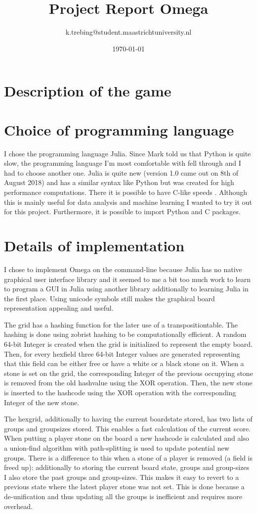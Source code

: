 \documentclass[a4paper]{article}
\title{Project Report Omega}
\author{k.trebing@student.maastrichtuniversity.nl}
\date{\today}
\begin{document}
\maketitle

\section{Description of the game}

\section{Choice of programming language}
I chose the programming language Julia. Since Mark told us that Python is quite slow, the programming language I'm most comfortable with fell through and I had to choose another one. Julia is quite new (version 1.0 came out on 8th of August 2018) \cite{julia1} and has a similar syntax like Python but was created for high performance computations. There it is possible to have C-like speeds \cite{benchmarks}. Although this is mainly useful for data analysis and machine learning I wanted to try it out for this project. Furthermore, it is possible to import Python and C packages.

\section{Details of implementation}
I chose to implement Omega on the command-line because Julia has no native graphical user interface library and it seemed to me a bit too much work to learn to program a GUI in Julia using another library additionally to learning Julia in the first place. Using unicode symbols still makes the graphical board representation appealing and useful.

The grid has a hashing function for the later use of a transpositiontable. The hashing is done using zobrist hashing \cite{zobrist1970new} to be computationally efficient. A random 64-bit Integer is created when the grid is initialized to represent the empty board. Then, for every hexfield three 64-bit Integer values are generated representing that this field can be either free or have a white or a black stone on it. When a stone is set on the grid, the corresponding Integer of the previous occupying stone is removed from the old hashvalue using the XOR operation. Then, the new stone is inserted to the hashcode using the XOR operation with the corresponding Integer of the new stone.

The hexgrid, additionally to having the current boardstate stored, has two lists of groups and groupsizes stored. This enables a fast calculation of the current score. When putting a player stone on the board a new hashcode is calculated and also a union-find algorithm \cite{galler1964improved} with path-splitting is used to update potential new groups. There is a difference to this when a stone of a player is removed (a field is freed up): additionally to storing the current board state, groups and group-sizes I also store the past groups and group-sizes. This makes it easy to revert to a previous state where the latest player stone was not set. This is done because a de-unification and thus updating all the groups is inefficient and requires more overhead.
\end{document}
